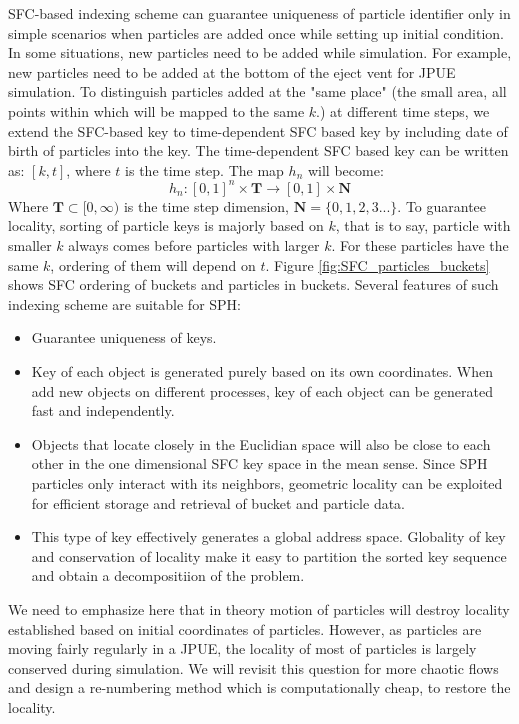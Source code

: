 \documentclass[conference,compsoc]{IEEEtran}
\begin{document}
SFC-based indexing scheme can guarantee uniqueness of particle identifier only in simple scenarios when particles are added once while setting up initial condition. In some situations, new particles need to be added while simulation. For example, new particles need to be added at the bottom of the eject vent for JPUE simulation. To distinguish particles added at the "same place" (the small area, all points within which will be mapped to the same $k$.) at different time steps, we extend the SFC-based key to time-dependent SFC based key by including date of birth of particles into the key. The time-dependent SFC based key can be written as: $[k,t]$, where $t$ is the time step. The map $h_n$ will become:
\begin{equation}
h_n: [0,1]^n \times \textbf{T} \rightarrow [0,1] \times \textbf{N}
\end{equation}
Where $\textbf{T} \subset [0,\infty)$ is the time step dimension, $\textbf{N}=\lbrace 0, 1, 2, 3...\rbrace$.
To guarantee locality, sorting of particle keys is majorly based on $k$, that is to say, particle with smaller $k$ always comes before particles with larger $k$. For these particles have the same $k$, ordering of them will depend on $t$. Figure \ref{fig:SFC_particles_buckets} shows SFC ordering of buckets and particles in buckets. 
Several features of such indexing scheme are suitable for SPH:
\begin{itemize}
\item Guarantee uniqueness of keys.
\item Key of each object is generated purely based on its own coordinates. When add new objects on different processes, key of each object can be generated fast and independently.
\item Objects that locate closely in the Euclidian space will also be close to each other in the one dimensional SFC key space in the mean sense. Since SPH particles only interact with its neighbors, geometric locality can be exploited for efficient storage and retrieval of bucket and particle data.
\item This type of key effectively generates a global address space. Globality of key and conservation of locality make it easy to partition the sorted key sequence and obtain a decompositiion of the problem.
\end{itemize}
We need to emphasize here that in theory motion of particles will destroy locality established based on initial coordinates of particles. However, as particles are moving fairly regularly in a JPUE, the locality of most of particles is largely conserved during simulation. We will revisit this question for more chaotic flows and 
design a re-numbering method which is computationally cheap, to restore the locality.
\end{document}
